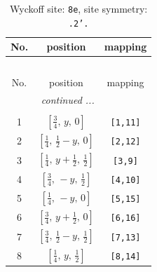 \documentclass[fleqn,8pt]{jsarticle}
\begin{document}
\begin{longtable}{ccc}
\caption{Wyckoff site: {\tt 8e}, site symmetry: {\tt .2'.}}
 \\
 \hline \hline
No. & position & mapping \\ \hline \endfirsthead

\multicolumn{2}{l}{\tablename\ \thetable{}} \\
 \hline \hline
No. & position & mapping \\ \hline \endhead

 \hline \hline
\multicolumn{2}{r}{\footnotesize\it continued ...} \\ \endfoot

 \hline \hline
\multicolumn{2}{r}{} \\ \endlastfoot

1 & $\left[ \frac{3}{4},\, y,\, 0 \right]$ & {\tt [1,11]} \\ \hline
2 & $\left[ \frac{1}{4},\, \frac{1}{2} - y,\, 0 \right]$ & {\tt [2,12]} \\ \hline
3 & $\left[ \frac{1}{4},\, y + \frac{1}{2},\, \frac{1}{2} \right]$ & {\tt [3,9]} \\ \hline
4 & $\left[ \frac{3}{4},\, - y,\, \frac{1}{2} \right]$ & {\tt [4,10]} \\ \hline
5 & $\left[ \frac{1}{4},\, - y,\, 0 \right]$ & {\tt [5,15]} \\ \hline
6 & $\left[ \frac{3}{4},\, y + \frac{1}{2},\, 0 \right]$ & {\tt [6,16]} \\ \hline
7 & $\left[ \frac{3}{4},\, \frac{1}{2} - y,\, \frac{1}{2} \right]$ & {\tt [7,13]} \\ \hline
8 & $\left[ \frac{1}{4},\, y,\, \frac{1}{2} \right]$ & {\tt [8,14]} \\
\end{longtable}
\renewcommand{\arraystretch}{1.2}
\end{document}
